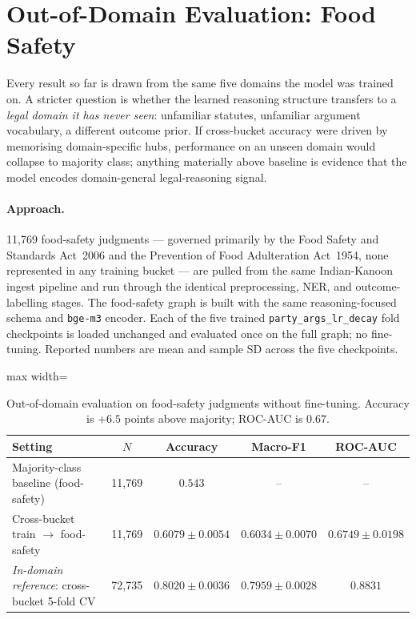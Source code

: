 \section{Out-of-Domain Evaluation: Food Safety}
\label{sec:cross_domain_food_safety}

Every result so far is drawn from the same five domains the model was trained on. A stricter question is whether the learned reasoning structure transfers to a \emph{legal domain it has never seen}: unfamiliar statutes, unfamiliar argument vocabulary, a different outcome prior. If cross-bucket accuracy were driven by memorising domain-specific hubs, performance on an unseen domain would collapse to majority class; anything materially above baseline is evidence that the model encodes domain-general legal-reasoning signal.

\paragraph{Approach.} 11{,}769 food-safety judgments --- governed primarily by the Food Safety and Standards Act~2006 and the Prevention of Food Adulteration Act~1954, none represented in any training bucket --- are pulled from the same Indian-Kanoon ingest pipeline and run through the identical preprocessing, NER, and outcome-labelling stages. The food-safety graph is built with the same reasoning-focused schema and \texttt{bge-m3} encoder. Each of the five trained \texttt{party\_args\_lr\_decay} fold checkpoints is loaded unchanged and evaluated once on the full graph; no fine-tuning. Reported numbers are mean and sample SD across the five checkpoints.

\begin{table}[H]
  \centering
  \small
  \begin{adjustbox}{max width=\textwidth}
  \begin{tabular}{lcccc}
    \toprule
    Setting & $N$ & Accuracy & Macro-F1 & ROC-AUC \\
    \midrule
    Majority-class baseline (food-safety) & 11{,}769 & $0.543$ & -- & -- \\
    Cross-bucket train $\to$ food-safety  & 11{,}769 & $0.6079\pm0.0054$ & $0.6034\pm0.0070$ & $0.6749\pm0.0198$ \\
    \midrule
    \emph{In-domain reference}: cross-bucket 5-fold CV
      & 72{,}735 & $0.8020\pm0.0036$ & $0.7959\pm0.0028$ & $0.8831$ \\
    \bottomrule
  \end{tabular}
  \end{adjustbox}
  \caption{Out-of-domain evaluation on food-safety judgments without fine-tuning. Accuracy is $+6.5$ points above majority; ROC-AUC is $0.67$.}
  \label{tab:cross_domain_food_safety}
\end{table}

